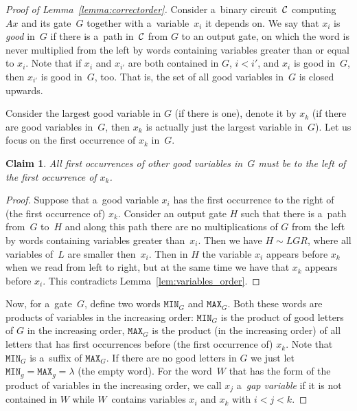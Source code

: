 \documentclass[11pt,letterpaper]{article}
\newtheorem{claim}{Claim}
\newcommand{\mmin}{\texttt{MIN}}
\newcommand{\mmax}{\texttt{MAX}}
\begin{document}

\begin{proof}[Proof of Lemma~\ref{lemma:correctorder}]
Consider a~binary circuit~${\cal C}$ computing~$Ax$ and its gate~$G$ together with a~variable~$x_i$ it depends on.
We say that $x_i$ is \emph{good} in~$G$ if there is 
a~path in~${\cal C}$ from $G$ to an output gate, on which the word is never multiplied from the left by words containing variables greater than or equal to $x_i$.
Note that if $x_i$ and $x_{i'}$ are both contained in $G$, $i<i'$, and $x_i$ is good in~$G$, then $x_{i'}$ is good in~$G$, too. That is, the set of all good variables in~$G$ is closed upwards.

Consider the largest good variable in $G$ (if there is one), denote it by $x_k$ (if there are good variables in~$G$, then $x_k$ is actually just the largest variable in~$G${}). Let us focus on the first occurrence of $x_k$ in~$G$.

\begin{claim}
All first occurrences of other good variables in~$G$ must be to the left of the first occurrence of $x_k$.
\end{claim}

\begin{proof}
Suppose that a~good variable $x_i$ has the first occurrence to the right of (the first occurrence of) $x_k$. Consider an output gate $H$ such that there is a~path from~$G$ to~$H$ and along this path there are no multiplications of $G$ from the left by words containing variables greater than~$x_i$. Then we have $H \sim LGR$, where all variables of~$L$ are smaller then~$x_i$. Then in $H$ the variable $x_i$ appears before $x_k$ when we read from left to right, but at the same time we have that $x_k$ appears before $x_i$. This contradicts Lemma~\ref{lem:variables_order}.
\end{proof}

Now, for a~gate~$G$, define two words $\mmin_G$ and $\mmax_G$. Both these words are products of variables in the increasing order: $\mmin_G$ is the product of good letters of $G$ in the increasing order, $\mmax_G$ is the product (in the increasing order) of all letters that has first occurrences before (the first occurrence of) $x_k$. Note that $\mmin_G$ is 
a~suffix of $\mmax_G$. If there are no good letters in $G$ we just let $\mmin_g=\mmax_g=\lambda$ (the empty word).
%
For the word~$W$ that has the form of the product of variables in the increasing order, we call $x_j$ a~\emph{gap variable} if it is not contained in $W$ 
while $W$~contains variables $x_i$ and $x_k$ with $i < j < k$.


\end{proof}
\end{document}
